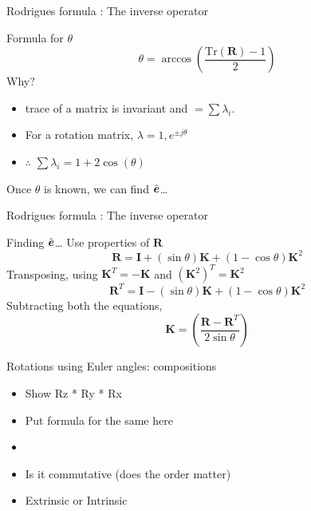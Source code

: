 \documentclass[notes]{beamer}
\newcommand{\gv}[1]{\ensuremath{\mbox{\boldmath$ #1 $}}}
\begin{document}
\begin{frame}[label={sec:org9552977}]{Rodrigues formula : The inverse operator}
\begin{block}{Formula for \(\theta\)}
\[ \theta = \arccos\left( \frac{\text{Tr}(\mathbf{R}) - 1}{2}\right) \]
Why?
\begin{itemize}
\item trace of a matrix is invariant and \(= \sum \lambda_i\).
\item For a rotation matrix, \(\lambda = {1, e^{\pm j \theta}}\)
\item \(\therefore\) \(\sum \lambda_i = 1 + 2 \cos(\theta)\)
\end{itemize}
\end{block}
\begin{block}{Once \(\theta\) is known, we can find \(\hat{\gv{e}}\)\ldots{}}
\end{block}
\end{frame}
\begin{frame}[label={sec:org7f268bf}]{Rodrigues formula : The inverse operator}
\begin{block}{Finding \(\hat{\gv{e}}\)\ldots{}}
 Use properties of \(\mathbf{R}\)
\[ \mathbf {R} =\mathbf {I} +(\sin \theta )\mathbf {K} +(1-\cos \theta )\mathbf {K} ^{2} \]
Transposing, using \(\mathbf{K}^T = -\mathbf{K}\) and \((\mathbf{K}^2)^{T} = \mathbf{K}^2\)
\[ \mathbf {R}^T =\mathbf {I} - (\sin \theta )\mathbf {K} +(1-\cos \theta )\mathbf {K} ^{2} \]
Subtracting both the equations,
\[ \mathbf{K} = \left( \frac{\mathbf {R} - \mathbf {R}^T}{2 \sin \theta} \right) \]
\end{block}
\end{frame}

\begin{frame}[label={sec:orgbfc9b9a}]{Rotations using Euler angles: compositions}
\begin{itemize}
\item Show Rz * Ry * Rx
\item Put formula for the same here
\item

\item Is it commutative (does the order matter)
\item Extrinsic or Intrinsic
\end{itemize}
\end{frame}
\end{document}
